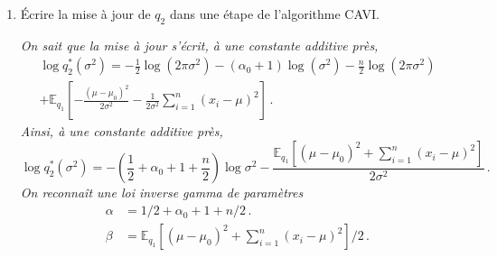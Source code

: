 \documentclass[a4paper,10pt,fleqn]{article}
\newcommand{\1}{\ensuremath{\mathbbm{1}}}
\begin{document}
\begin{enumerate}
\vspace{.2cm}

{\em
On sait que la mise \`a jour s'\'ecrit, \`a une constante additive pr\`es,
$$
\log q^*_1(\mu) = \mathbb{E}_{q_{2}}\left[- \frac{(\mu-\mu_0)^2}{2\sigma^2} - \frac{1}{2\sigma^2}\sum_{i=1}^n(x_i-\mu)^2\right]\,.
$$
Ainsi, \`a une constante additive pr\`es,
$$
\log q^*_1(\mu) = -\mathbb{E}_{q_{2}}\left[\frac{n+1}{2\sigma^2}\left(\mu - \frac{\mu_0 + n\bar x_n}{n+1}\right)^2\right]\,,
$$
o\`u $\bar x_n = \sum_{i=1}^n x_i/n$. Ainsi, %
$$
\log q^*_1(\mu) = -\frac{1}{2}(n+1)\mathbb{E}_{q_{2}}[1/\sigma^2]\left(\mu - \frac{\mu_0 + n\bar x_n}{n+1}\right)^2\,.
$$
On en d\'eduit que $q^*_1$ est la densit\'e de la loi gaussienne de moyenne $(\mu_0 + n\bar x_n)/(n+1)$  et dont l'inverse de la variance est $(n+1)\mathbb{E}_{q_{2}}[1/\sigma^2]$ (qui est calculable lorsque $q_{2}$ est une loi inverse gamma).
}
\item \'Ecrire la mise \`a jour de $q_{2}$ dans une \'etape de l'algorithme CAVI. 

\vspace{.2cm}

{\em
On sait que la mise \`a jour s'\'ecrit, \`a une constante additive pr\`es,
\begin{multline*}
\log q^*_{2}(\sigma^2) =  -\frac{1}{2}\log(2\pi \sigma^2) - (\alpha_0+1)\log(\sigma^{2})  -\frac{n}{2}\log(2\pi \sigma^2)\\
+\mathbb{E}_{q_1}\left[- \frac{(\mu-\mu_0)^2}{2\sigma^2}  - \frac{1}{2\sigma^2}\sum_{i=1}^n(x_i-\mu)^2\right]\,.
\end{multline*}
Ainsi, \`a une constante additive pr\`es,
$$
\log q^*_{2}(\sigma^2) = -\left(\frac{1}{2} + \alpha_0+1+\frac{n}{2}\right)\log\sigma^2 -\frac{\mathbb{E}_{q_1}\left[(\mu-\mu_0)^2 + \sum_{i=1}^n(x_i-\mu)^2\right]}{2\sigma^2}\,.
$$
On reconna\^it une loi inverse gamma de param\`etres 
\begin{align*}
\alpha &= 1/2 + \alpha_0+1+n/2\,.\\
\beta &= \mathbb{E}_{q_1}\left[(\mu-\mu_0)^2 + \sum_{i=1}^n(x_i-\mu)^2\right]/2\,.
\end{align*}
}
\end{enumerate}
\end{document}
